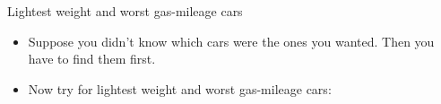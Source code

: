 \documentclass[ignorenonframetext,]{beamer}
\newenvironment{Shaded}{\begin{snugshade}}{\end{snugshade}}
\newcommand{\DataTypeTok}[1]{\textcolor[rgb]{0.13,0.29,0.53}{#1}}
\newcommand{\KeywordTok}[1]{\textcolor[rgb]{0.13,0.29,0.53}{\textbf{#1}}}
\newcommand{\NormalTok}[1]{#1}
\newcommand{\OperatorTok}[1]{\textcolor[rgb]{0.81,0.36,0.00}{\textbf{#1}}}
\newcommand{\StringTok}[1]{\textcolor[rgb]{0.31,0.60,0.02}{#1}}
\providecommand{\tightlist}{%
  \setlength{\itemsep}{0pt}\setlength{\parskip}{0pt}}
\begin{document}
\begin{frame}[fragile]{Lightest weight and worst gas-mileage cars}
\protect\hypertarget{lightest-weight-and-worst-gas-mileage-cars}{}

\begin{itemize}
\tightlist
\item
  Suppose you didn't know which cars were the ones you wanted. Then you
  have to find them first.
\item
  Now try for lightest weight and worst gas-mileage cars:
\end{itemize}

\begin{Shaded}
\end{Shaded}

\end{frame}
\end{document}
